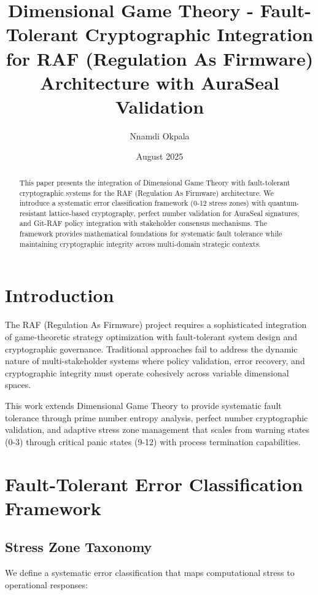 \documentclass[a4paper,12pt]{article}
\title{Dimensional Game Theory - Fault-Tolerant Cryptographic Integration\\
for RAF (Regulation As Firmware) Architecture with AuraSeal Validation}
\author{Nnamdi Okpala}
\date{August 2025}
\begin{document}
\maketitle

\begin{abstract}
This paper presents the integration of Dimensional Game Theory with fault-tolerant cryptographic systems for the RAF (Regulation As Firmware) architecture. We introduce a systematic error classification framework (0-12 stress zones) with quantum-resistant lattice-based cryptography, perfect number validation for AuraSeal signatures, and Git-RAF policy integration with stakeholder consensus mechanisms. The framework provides mathematical foundations for systematic fault tolerance while maintaining cryptographic integrity across multi-domain strategic contexts.
\end{abstract}

\tableofcontents

\section{Introduction}

The RAF (Regulation As Firmware) project requires a sophisticated integration of game-theoretic strategy optimization with fault-tolerant system design and cryptographic governance. Traditional approaches fail to address the dynamic nature of multi-stakeholder systems where policy validation, error recovery, and cryptographic integrity must operate cohesively across variable dimensional spaces.

This work extends Dimensional Game Theory to provide systematic fault tolerance through prime number entropy analysis, perfect number cryptographic validation, and adaptive stress zone management that scales from warning states (0-3) through critical panic states (9-12) with process termination capabilities.

\section{Fault-Tolerant Error Classification Framework}

\subsection{Stress Zone Taxonomy}

We define a systematic error classification that maps computational stress to operational responses:
\end{document}
